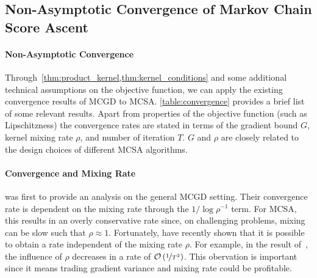 \subsection{Non-Asymptotic Convergence of Markov Chain Score Ascent}%
\vspace{-0.05in}
\paragraph{Non-Asymptotic Convergence}
Through~\cref{thm:product_kernel,thm:kernel_conditions} and some additional technical assumptions on the objective function, we can apply the existing convergence results of MCGD to MCSA.
\cref{table:convergence} provides a brief list of some relevant results.
Apart from properties of the objective function (such as Lipschitzness) the convergence rates are stated in terms of the gradient bound \(G\), kernel mixing rate \(\rho\), and number of iteration \(T\).
\(G\) and \(\rho\) are closely related to the design choices of different MCSA algorithms.

\vspace{-0.1in}
\paragraph{Convergence and Mixing Rate}
\citet{duchi_ergodic_2012} was first to provide an analysis on the general MCGD setting.
Their convergence rate is dependent on the mixing rate through the \(1 / \log \rho^{-1}\) term.
For MCSA, this results in an overly conservative rate since, on challenging problems, mixing can be slow such that \(\rho \approx 1\).
Fortunately, \citet{doan_convergence_2020,doan_finitetime_2020} have recently shown that it is possible to obtain a rate independent of the mixing rate \(\rho\).
For example, in the result of~\citet{doan_finitetime_2020}, the influence of \(\rho\) decreases in a rate of \(\mathcal{O}\left(\nicefrac{1}{T^2}\right)\).
This obervation is important since it means trading gradient variance and mixing rate could be profitable.

